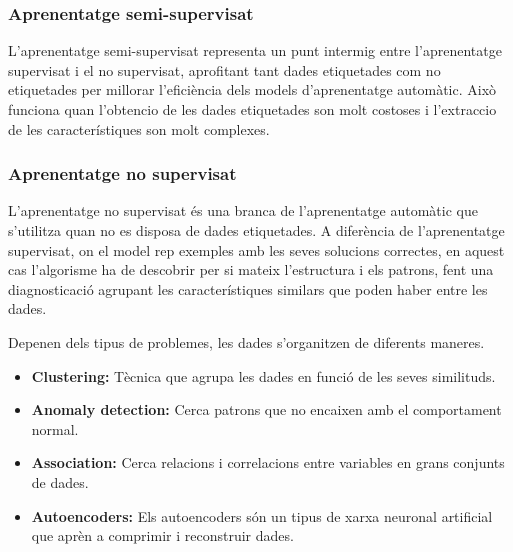 \subsubsection{Aprenentatge semi-supervisat}\label{subsubsec:Aprenentatge semi-supervisat}

L'aprenentatge semi-supervisat representa un punt intermig entre l'aprenentatge supervisat i el no supervisat, aprofitant tant dades etiquetades com no etiquetades per millorar l'eficiència dels models d'aprenentatge automàtic. Això funciona quan l'obtencio de les dades etiquetades son molt costoses i l'extraccio de les característiques son molt complexes.
\subsubsection{Aprenentatge no supervisat}\label{subsubsec:Aprenentatge no supervisat}

L'aprenentatge no supervisat és una branca de l'aprenentatge automàtic que s'utilitza quan no es disposa de dades etiquetades. A diferència de l'aprenentatge supervisat, on el model rep exemples amb les seves solucions correctes, en aquest cas l'algorisme ha de descobrir per si mateix l'estructura i els patrons, fent una diagnosticació agrupant les característiques similars que poden haber entre les dades.

Depenen dels tipus de  problemes, les dades s'organitzen de diferents maneres.
\begin{itemize}
 \item \textbf{Clustering:} Tècnica que agrupa les dades en funció de les seves similituds.
 \item \textbf{Anomaly detection:} Cerca patrons que no encaixen amb el comportament normal.
 \item \textbf{Association:} Cerca relacions i correlacions entre variables en grans conjunts de dades.
 \item \textbf{Autoencoders:} Els autoencoders són un tipus de xarxa neuronal artificial que aprèn a comprimir i reconstruir dades.
\end{itemize}


